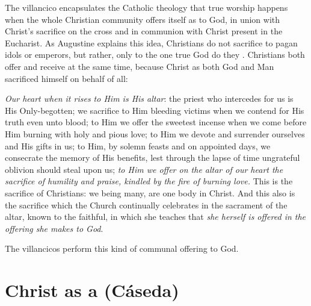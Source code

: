 
The villancico encapsulates the Catholic theology that true worship happens
when the whole Christian community offers itself as 
 to God, in union with Christ's sacrifice on the cross and
in communion with Christ present in the Eucharist.
As Augustine explains this idea, Christians do not sacrifice to pagan idols or
emperors, but rather, only to the one true God do they .%
    \Autocite[10:3]{Augustine:CityofGod}
Christians both offer and receive at the same time, because Christ as both God
and Man sacrificed himself on behalf of all:
\begin{quoting}
    \emph{Our heart when it rises to Him is His altar}: the priest who
    intercedes for us is His Only-begotten; we sacrifice to Him bleeding
    victims when we contend for His truth even unto blood; to Him we offer the
    sweetest incense when we come before Him burning with holy and pious love;
    to Him we devote and surrender ourselves and His gifts in us; to Him, by
    solemn feasts and on appointed days, we consecrate the memory of His
    benefits, lest through the lapse of time ungrateful oblivion should steal
    upon us; \emph{to Him we offer on the altar of our heart the sacrifice of
    humility and praise, kindled by the fire of burning love.}
    This is the sacrifice of Christians: we being many, are one body in Christ.
    And this also is the sacrifice which the Church continually celebrates in
    the sacrament of the altar, known to the faithful, in which she teaches
    that \emph{she herself is offered in the offering she makes to God}.%
        \Autocite[10:6, emphasis added]{Augustine:CityofGod}
\end{quoting}
The  villancicos perform this kind of communal offering
to God.


\section{Christ as a  (Cáseda)}

